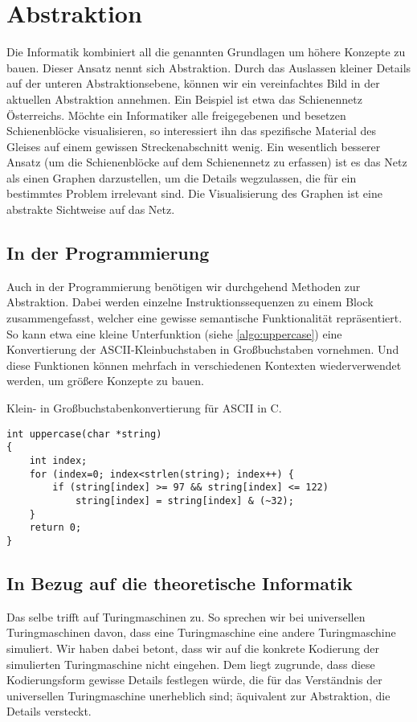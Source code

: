 \chapter{Abstraktion}
%
Die Informatik kombiniert all die genannten Grundlagen um höhere Konzepte
zu bauen. Dieser Ansatz nennt sich Abstraktion. Durch das Auslassen kleiner
Details auf der unteren Abstraktionsebene, können wir ein vereinfachtes Bild
in der aktuellen Abstraktion annehmen.
Ein Beispiel ist etwa das Schienennetz Österreichs. Möchte ein Informatiker
alle freigegebenen und besetzen Schienenblöcke visualisieren, so interessiert
ihn das spezifische Material des Gleises auf einem gewissen Streckenabschnitt
wenig. Ein wesentlich besserer Ansatz (um die Schienenblöcke auf dem
Schienennetz zu erfassen) ist es das Netz als einen Graphen darzustellen,
um die Details wegzulassen, die für ein bestimmtes Problem irrelevant sind.
Die Visualisierung des Graphen ist eine abstrakte Sichtweise auf das Netz.

\section{In der Programmierung}
%
Auch in der Programmierung benötigen wir durchgehend Methoden zur Abstraktion.
Dabei werden einzelne Instruktionssequenzen zu einem Block zusammengefasst,
welcher eine gewisse semantische Funktionalität repräsentiert. So kann etwa
eine kleine Unterfunktion (siehe \ref{algo:uppercase}) eine Konvertierung
der ASCII-Kleinbuchstaben in Großbuchstaben vornehmen. Und diese Funktionen
können mehrfach in verschiedenen Kontexten wiederverwendet werden,
um größere Konzepte zu bauen.

\begin{algorithm}[b]
\caption{Klein- in Großbuchstabenkonvertierung für ASCII in C.}
\label{algo:uppercase}
\begin{verbatim}
int uppercase(char *string)
{
    int index;
    for (index=0; index<strlen(string); index++) {
        if (string[index] >= 97 && string[index] <= 122)
            string[index] = string[index] & (~32);
    }
    return 0;
}
\end{verbatim}
\end{algorithm}

\section{In Bezug auf die theoretische Informatik}
%
Das selbe trifft auf Turingmaschinen zu. So sprechen wir bei universellen
Turingmaschinen davon, dass eine Turingmaschine eine andere Turingmaschine
simuliert. Wir haben dabei betont, dass wir auf die konkrete Kodierung der
simulierten Turingmaschine nicht eingehen. Dem liegt zugrunde, dass diese
Kodierungsform gewisse Details festlegen würde, die für das Verständnis
der universellen Turingmaschine unerheblich sind; äquivalent zur Abstraktion,
die Details versteckt.

